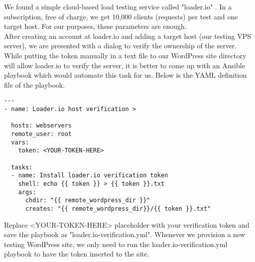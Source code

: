 We found a simple cloud-based load testing service called "loader.io" \cite{Loader.io:main_site}. In a subscription, free of charge, we get 10,000 clients (requests) per test and one target host. For our purposes, these parameters are enough. \\

After creating an account at loader.io and adding a target host (our testing VPS server), we are presented with a dialog to verify the ownership of the server. While putting the token manually in a text file to our WordPress site directory will allow loader.io to verify the server, it is better to come up with an Ansible playbook which would automate this task for us. Below is the YAML definition file of the playbook.

\begin{lstlisting}
---
- name: Loader.io host verification >
 
  hosts: webservers
  remote_user: root
  vars:
    token: <YOUR-TOKEN-HERE>
 
  tasks:
  - name: Install loader.io verification token
    shell: echo {{ token }} > {{ token }}.txt
    args:
      chdir: "{{ remote_wordpress_dir }}"
      creates: "{{ remote_wordpress_dir}}/{{ token }}.txt"
\end{lstlisting}

Replace <YOUR-TOKEN-HERE> placeholder with your verification token and save the playbook as "loader.io-verification.yml". Whenever we provision a new testing WordPress site, we only need to run the loader.io-verification.yml playbook to have the token inserted to the site.
